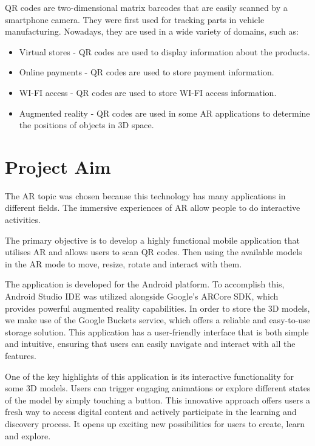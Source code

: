 \ac{QR} codes are two-dimensional matrix barcodes that are easily scanned by a smartphone camera. They were first used for tracking parts in vehicle manufacturing. Nowadays, they are used in a wide variety of domains, such as:
\begin{itemize}
    \item Virtual stores - \ac{QR} codes are used to display information about the products.
    \item Online payments - \ac{QR} codes are used to store payment information.
    \item WI-FI access - \ac{QR} codes are used to store WI-FI access information.
    \item Augmented reality - \ac{QR} codes are used in some \ac{AR} applications to determine the positions of objects in \ac{3D} space.
\end{itemize}


\section{Project Aim}
The \ac{AR} topic was chosen because this technology has many applications in different fields. The immersive experiences of \ac{AR} allow people to do interactive activities.

The primary objective is to develop a highly functional mobile application that utilises \ac{AR} and allows users to scan \ac{QR} codes. Then using the available models in the \acf{AR} mode to move, resize, rotate and interact with them.

The application is developed for the Android platform. To accomplish this, Android Studio \ac{IDE} was utilized alongside Google's ARCore \ac{SDK}, which provides powerful augmented reality capabilities. In order to store the \ac{3D} models, we make use of the Google Buckets service, which offers a reliable and easy-to-use storage solution. This application has a user-friendly interface that is both simple and intuitive, ensuring that users can easily navigate and interact with all the features.

One of the key highlights of this application is its interactive functionality for some \ac{3D} models. Users can trigger engaging animations or explore different states of the model by simply touching a button. This innovative approach offers users a fresh way to access digital content and actively participate in the learning and discovery process. It opens up exciting new possibilities for users to create, learn and explore.

